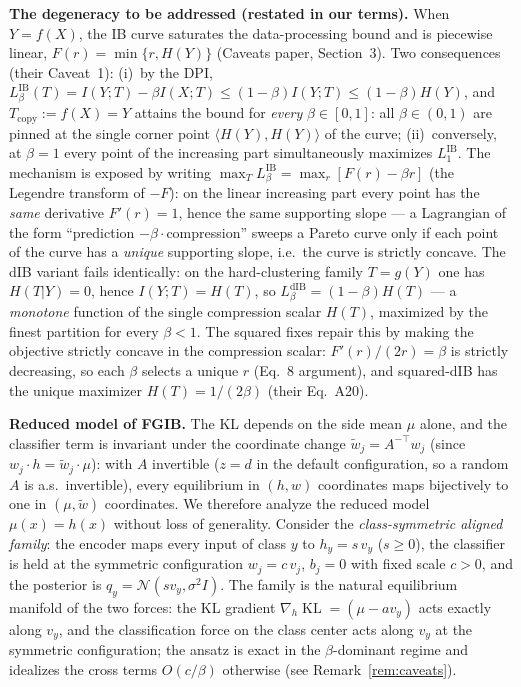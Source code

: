 \textbf{The degeneracy to be addressed (restated in our terms).}
When $Y = f(X)$, the IB curve saturates the data-processing bound and is piecewise linear,
$F(r) = \min\{r, H(Y)\}$ (Caveats paper, Section~3). Two consequences (their Caveat~1):
(i)~by the DPI, $L^{\mathrm{IB}}_\beta(T) = I(Y;T) - \beta I(X;T) \le (1-\beta)I(Y;T)
\le (1-\beta)H(Y)$, and $T_{\mathrm{copy}} := f(X) = Y$ attains the bound for
\emph{every} $\beta \in [0,1]$: all $\beta \in (0,1)$ are pinned at the single corner point
$\langle H(Y), H(Y)\rangle$ of the curve; (ii)~conversely, at $\beta = 1$ every point of the
increasing part simultaneously maximizes $L^{\mathrm{IB}}_1$. The mechanism is exposed by
writing $\max_T L^{\mathrm{IB}}_\beta = \max_r [F(r) - \beta r]$ (the Legendre transform of
$-F$): on the linear increasing part every point has the \emph{same} derivative
$F'(r) = 1$, hence the same supporting slope --- a Lagrangian of the form
``prediction $-\beta\cdot{}$compression'' sweeps a Pareto curve only if each point of the
curve has a \emph{unique} supporting slope, i.e.\ the curve is strictly concave.
The dIB variant fails identically: on the hard-clustering family $T = g(Y)$ one has
$H(T|Y) = 0$, hence $I(Y;T) = H(T)$, so $L^{\mathrm{dIB}}_\beta = (1-\beta)H(T)$ --- a
\emph{monotone} function of the single compression scalar $H(T)$, maximized by the finest
partition for every $\beta < 1$. The squared fixes repair this by making the objective
strictly concave in the compression scalar: $F'(r)/(2r) = \beta$ is strictly decreasing, so
each $\beta$ selects a unique $r$ (Eq.~8 argument), and squared-dIB has the unique maximizer
$H(T) = 1/(2\beta)$ (their Eq.~A20).

\textbf{Reduced model of FGIB.}
The KL depends on the side mean $\mu$ alone, and the classifier term is invariant under the
coordinate change $\tilde w_j = A^{-\top} w_j$ (since $w_j \cdot h = \tilde w_j \cdot \mu$):
with $A$ invertible ($z = d$ in the default configuration, so a random $A$ is a.s.\
invertible), every equilibrium in $(h, w)$ coordinates maps bijectively to one in
$(\mu, \tilde w)$ coordinates. We therefore analyze the reduced model $\mu(x) = h(x)$
without loss of generality.
Consider the \emph{class-symmetric aligned family}: the encoder maps every input of class $y$
to $h_y = s\,v_y$ ($s \ge 0$), the classifier is held at the symmetric configuration
$w_j = c\,v_j$, $b_j = 0$ with fixed scale $c > 0$, and the posterior is
$q_y = \mathcal{N}(s v_y, \sigma^2 I)$. The family is the natural equilibrium manifold of
the two forces: the KL gradient $\nabla_h \operatorname{KL} = (\mu - a v_y)$ acts exactly
along $v_y$, and the classification force on the class center acts along $v_y$ at the
symmetric configuration; the ansatz is exact in the $\beta$-dominant regime and idealizes
the cross terms $O(c/\beta)$ otherwise (see Remark~\ref{rem:caveats}).

